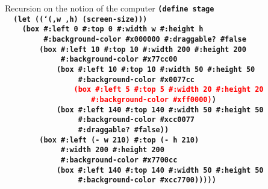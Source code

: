 \begin{frame}{Recursion on the notion of the computer}
  \scriptsize
  \texttt{\textbf{(define stage\\
    \ \ (let ((`(,w ,h) (screen-size)))\\
    \ \ \ \ (box \#:left 0 \#:top 0 \#:width w \#:height h\\
    \ \ \ \ \ \ \ \ \ \#:background-color \#x000000 \#:draggable?\ \#false\\
    \ \ \ \ \ \ \ \ \textcolor{topleftbox}{(box \#:left 10 \#:top 10 \#:width 200 \#:height 200\\
    \ \ \ \ \ \ \ \ \ \ \ \ \ \#:background-color \#x77cc00\\
    \ \ \ \ \ \ \ \ \ \ \ \ \textcolor{innertopleft}{(box \#:left 10 \#:top 10 \#:width 50 \#:height 50\\
    \ \ \ \ \ \ \ \ \ \ \ \ \ \ \ \ \ \#:background-color \#x0077cc\\
    \ \ \ \ \ \ \ \ \ \ \ \ \ \ \ \ \textcolor{red}{(box \#:left 5 \#:top 5 \#:width 20 \#:height 20\\
    \ \ \ \ \ \ \ \ \ \ \ \ \ \ \ \ \ \ \ \ \#:background-color \#xff0000)})}\\
    \ \ \ \ \ \ \ \ \ \ \ \ \textcolor{innerbottomright}{(box \#:left 140 \#:top 140 \#:width 50 \#:height 50\\
    \ \ \ \ \ \ \ \ \ \ \ \ \ \ \ \ \ \#:background-color \#xcc0077\\
    \ \ \ \ \ \ \ \ \ \ \ \ \ \ \ \ \ \#:draggable?\ \#false)})}\\
    \ \ \ \ \ \ \ \ \textcolor{bottomrightbox}{(box \#:left (- w 210) \#:top (- h 210) \\
    \ \ \ \ \ \ \ \ \ \ \ \ \ \#:width 200 \#:height 200\\
    \ \ \ \ \ \ \ \ \ \ \ \ \ \#:background-color \#x7700cc\\
    \ \ \ \ \ \ \ \ \ \ \ \ \textcolor{innerbottomright2}{(box \#:left 140 \#:top 140 \#:width 50 \#:height 50\\
    \ \ \ \ \ \ \ \ \ \ \ \ \ \ \ \ \ \#:background-color \#xcc7700)})})))}}
\end{frame}
